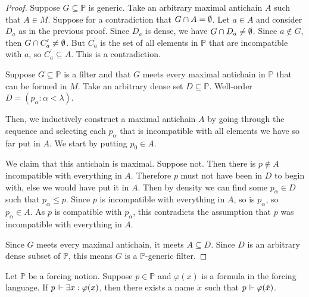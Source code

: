 \documentclass[11pt]{article}
\renewcommand{\P}{\mathbb{P}}
\renewcommand{\phi}{\varphi}
\begin{document}
\begin{proof}
    Suppose $G \subseteq \P$ is generic.
    Take an arbitrary maximal antichain $A$ such that $A \in M$.
    Suppose for a contradiction that $G \cap A = \emptyset$.
    Let $a \in A$ and consider $D_a$ as in the previous proof.
    Since $D_a$ is dense, we have $G \cap D_a \neq \emptyset$.
    Since $a \notin G$, then $G \cap C^\prime_a \neq \emptyset$.
    But $C^\prime_a$ is the set of all elements in $\P$ that are incompatible
    with $a$, so $C^\prime_a \subseteq A$. This is a contradiction.

    Suppose $G \subseteq \P$ is a filter and that $G$ meets every maximal
    antichain in $\P$ that can be formed in $M$.
    Take an arbitrary dense set $D \subseteq \P$.
    Well-order
    $D = (p_\alpha : \alpha < \lambda)$.

    Then, we inductively construct a maximal antichain $A$ by going through the
    sequence and selecting each $p_\alpha$ that is incompatible with all
    elements we have so far put in $A$. We start by putting $p_0 \in A$.

    We claim that this antichain is maximal.
    Suppose not.
    Then there is $p \notin A$ incompatible with everything in $A$.
    Therefore $p$ must not have been in $D$ to begin with, else we would have
    put it in $A$.
    Then by density we can find some $p_\alpha \in D$ such that
    $p_\alpha \leq p$.
    Since $p$ is incompatible with everything in $A$, so is $p_\alpha$,
    so $p_\alpha \in A$.
    As $p$ is compatible with $p_\alpha$, this contradicts the assumption that
    $p$ was incompatible with everything in $A$.

    Since $G$ meets every maximal antichain, it meets $A \subseteq D$.
    Since $D$ is an arbitrary dense subset of $\P$, this means $G$ is a
    $\P$-generic filter.
\end{proof}

\begin{prop}
    Let $\P$ be a forcing notion.
    Suppose $p \in \P$ and $\phi(x)$ is a formula in the forcing language.
    If $p \forces \exists x : \phi(x)$,
    then there exists a name $\dot x$ such that $p \forces \phi(\dot x)$.
\end{prop}
\end{document}

